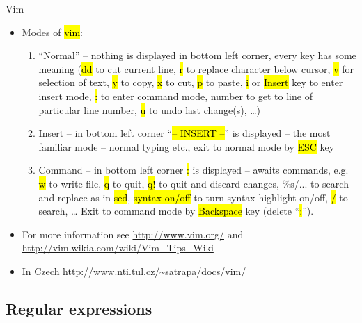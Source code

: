\documentclass[compress, ucs, xelatex, 11pt, xcolor=svgnames,
  hyperref={
    bookmarks=true,
    unicode=true,
    colorlinks=true,
    pdftitle={Linux, command line and MetaCentrum},
    plainpages=false,
    pdfauthor={Vojtech Zeisek},
    pdfsubject={Course about use of Linux command line, writing shell scripts and using MetaCentrum of CESNET},
    pdfcreator={XeLaTeX},
    pdfkeywords={Linux, GNU, BASH, shell, command line, MetaCentrum},
    linkcolor=Red,
    anchorcolor=Blue,
    citecolor=Purple,
    filecolor=DodgerBlue,
    menucolor=DarkOrchid,
    urlcolor=DeepSkyBlue,
    pdftex},
  url={hyphens, lowtilde} %
  ]{beamer}
\renewcommand{\texttt}[1]{\hl{\ttfamily #1}}
\begin{document}
\begin{frame}{Vim}
\begin{itemize}
 \item Modes of \texttt{vim}:
  \begin{enumerate}
   \item ``Normal'' -- nothing is displayed in bottom left corner, every key has some meaning (\texttt{dd} to cut current line, \texttt{r} to replace character below cursor, \texttt{v} for selection of text, \texttt{y} to copy, \texttt{x} to cut, \texttt{p} to paste, \texttt{i} or \texttt{Insert} key to enter insert mode, \texttt{:} to enter command mode, number to get to line of particular line number, \texttt{u} to undo last change(s), \ldots)
   \item Insert -- in bottom left corner ``\texttt{-- INSERT --}'' is displayed -- the most familiar mode -- normal typing etc., exit to normal mode by \texttt{ESC} key
   \item Command -- in bottom left corner \texttt{:} is displayed -- awaits commands, e.g. \texttt{w} to write file, \texttt{q} to quit, \texttt{q!} to quit and discard changes, \%s/... to search and replace as in \texttt{sed}, \texttt{syntax on/off} to turn syntax highlight on/off, \texttt{/} to search, \ldots{ }Exit to command mode by \texttt{Backspace} key (delete ``\texttt{:}'').
  \end{enumerate}
  \item For more information see \url{http://www.vim.org/} and \url{http://vim.wikia.com/wiki/Vim_Tips_Wiki}
  \item In Czech \url{http://www.nti.tul.cz/~satrapa/docs/vim/}
\end{itemize}
\end{frame}

\subsection{Regular expressions}
\end{document}
